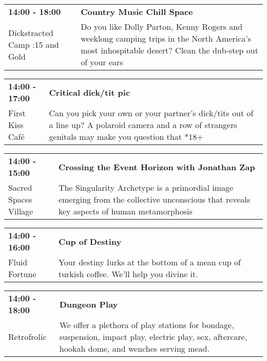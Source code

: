 \begin{tabular}{ p{1in} p{2.2in} }
    \textbf{14:00 - 18:00} & \textbf{Country Music Chill Space} \\
    Dickstracted Camp \newline 7:15 and Gold & Do you like Dolly Parton, Kenny Rogers and weeklong camping trips in the North America's most inhospitable desert? Clean the dub-step out of your ears \\
    \hline 
\end{tabular}
    
\begin{tabular}{ p{1in} p{2.2in} }
    \textbf{14:00 - 17:00} & \textbf{Critical dick/tit pic} \\
    First Kiss Caf\'e \newline  & Can you pick your own or your partner's dick/tits out of a line up?  A polaroid camera and a row of strangers genitals may make you question that *18+ \\
    \hline 
\end{tabular}
    
\begin{tabular}{ p{1in} p{2.2in} }
    \textbf{14:00 - 15:00} & \textbf{Crossing the Event Horizon with Jonathan Zap} \\
    Sacred Spaces Village \newline  & The Singularity Archetype is a primordial image emerging from the collective unconscious that reveals key aspects of human metamorphosis \\
    \hline 
\end{tabular}
    
\begin{tabular}{ p{1in} p{2.2in} }
    \textbf{14:00 - 16:00} & \textbf{Cup of Destiny} \\
    Fluid Fortune \newline  & Your destiny lurks at the bottom of a mean cup of turkish coffee. We'll help you divine it. \\
    \hline 
\end{tabular}
    
\begin{tabular}{ p{1in} p{2.2in} }
    \textbf{14:00 - 18:00} & \textbf{Dungeon Play} \\
    Retrofrolic \newline  & We offer a plethora of play stations for bondage, suspension, impact play, electric play, sex, aftercare, hookah dome, and wenches serving mead. \\
    \hline 
\end{tabular}
    
